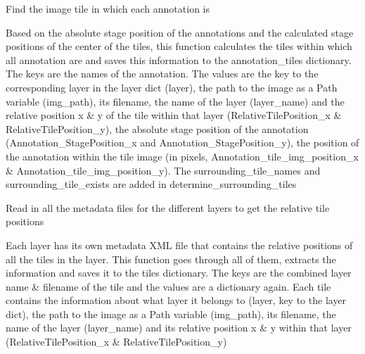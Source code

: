 \documentclass[letterpaper,10pt,english]{sphinxmanual}
\begin{document}
\begin{fulllineitems}
\begin{fulllineitems}
\end{fulllineitems}


\begin{fulllineitems}
\label{\detokenize{index:sites_of_interest_parser.MapsXmlParser.find_annotation_tile}}
Find the image tile in which each annotation is

Based on the absolute stage position of the annotations and the calculated stage positions of the center of the
tiles, this function calculates the tiles within which all annotation are and saves this information to the
annotation\_tiles dictionary. The keys are the names of the annotation. The values are the key to the
corresponding layer in the layer dict (layer), the path to the image as a Path variable (img\_path), its
filename, the name of the layer (layer\_name) and the relative position x \& y of the tile within that layer
(RelativeTilePosition\_x \& RelativeTilePosition\_y), the absolute stage position of the annotation
(Annotation\_StagePosition\_x and Annotation\_StagePosition\_y), the position of the annotation within the tile
image (in pixels, Annotation\_tile\_img\_position\_x \& Annotation\_tile\_img\_position\_y).
The surrounding\_tile\_names and surrounding\_tile\_exists are added in determine\_surrounding\_tiles

\end{fulllineitems}


\begin{fulllineitems}
\label{\detokenize{index:sites_of_interest_parser.MapsXmlParser.get_relative_tile_locations}}
Read in all the metadata files for the different layers to get the relative tile positions

Each layer has its own metadata XML file that contains the relative positions of all the tiles in the layer.
This function goes through all of them, extracts the information and saves it to the tiles dictionary.
The keys are the combined layer name \& filename of the tile and the values are a dictionary again. Each tile
contains the information about what layer it belongs to (layer, key to the layer dict), the path to the image as
a Path variable (img\_path), its filename, the name of the layer (layer\_name) and its relative position x \& y
within that layer (RelativeTilePosition\_x \& RelativeTilePosition\_y)


\end{fulllineitems}
\end{fulllineitems}
\end{document}
